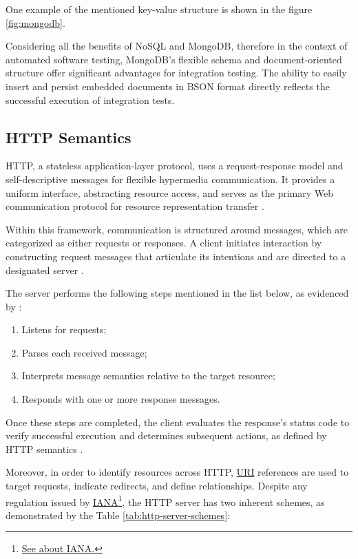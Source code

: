 One example of the mentioned key-value structure is shown in the figure \ref{fig:mongodb}.
 
Considering all the benefits of NoSQL and MongoDB, therefore in the context of automated software testing, MongoDB's flexible schema and document-oriented structure offer significant advantages for integration testing. The ability to easily insert and persist embedded documents in BSON format directly reflects the successful execution of integration tests.

\subsection{HTTP Semantics}
\label{subsection:http_semantics}

HTTP, a stateless application-layer protocol, uses a request-response model and self-descriptive messages for flexible hypermedia communication.
 It provides a uniform interface, abstracting resource access, and serves as the primary  Web communication protocol for resource representation
  transfer \cite{rfc9110, fielding2000thesis}.

Within this framework, communication is structured around messages, which are categorized as either requests or responses. A client initiates interaction by constructing request messages that articulate its intentions and are directed to a designated server \cite{rfc9110}.

The server performs the following steps mentioned in the list below, as evidenced by \cite{rfc9110}:

\begin{enumerate}
    \item Listens for requests;
    \item Parses each received message;
    \item Interprets message semantics relative to the target resource;
    \item Responds with one or more response messages.
\end{enumerate}

Once these steps are completed, the client evaluates the response’s status code to verify successful execution and determines subsequent actions, 
as defined by HTTP semantics \cite{rfc9110}.

Moreover, in order to identify resources across HTTP, \hyperref[appendix:glossary]{URI} references are used to target requests, indicate redirects, and define relationships.
Despite any regulation issued by \hyperref[appendix:glossary]{IANA}\footnote{\href{https://www.iana.org/about}{See about IANA.}}, 
the HTTP server has two inherent schemes, as demonstrated by the Table \ref{tab:http-server-schemes}: 


